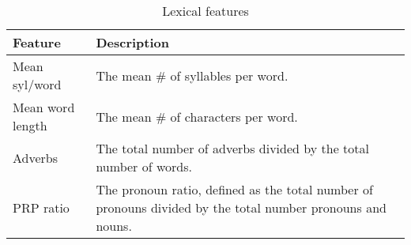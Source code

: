 \documentclass{article}
\begin{document}
\begin{table}[h]
\caption{Lexical features}
\begin{tabular}{|p{3.5cm}|p{9.5cm}|}
\hline
\textbf{Feature} & \textbf{Description} \\ \hline
Mean syl/word & The mean \# of syllables per word.\\ \hline
Mean word length & The mean \# of characters per word. \\ \hline
Adverbs & The total number of adverbs divided by the total number of words.\\ \hline
PRP ratio & The pronoun ratio, defined as the total number of pronouns divided by the total number pronouns and nouns.\\ \hline
\end{tabular}
\end{table}
\end{document}
